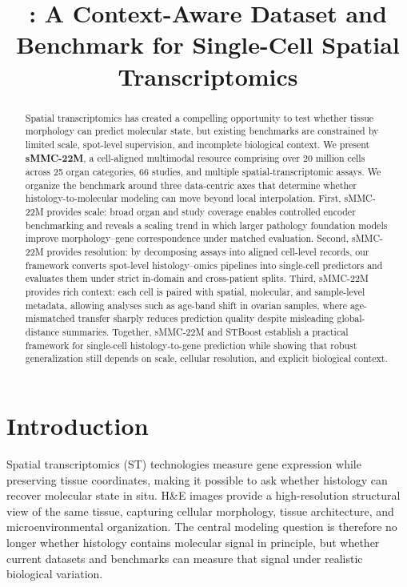 \documentclass{article}
\title{\textbf{\dataset}: A Context-Aware Dataset and Benchmark for Single-Cell Spatial Transcriptomics}
\author{}
\newcommand{\dataset}{sMMC-22M\xspace}
\newcommand{\methodname}{STBoost\xspace}
\begin{document}
\maketitle
\begin{abstract}
Spatial transcriptomics has created a compelling opportunity to test whether tissue morphology can predict molecular state, but existing benchmarks are constrained by limited scale, spot-level supervision, and incomplete biological context. We present \textbf{\dataset}, a cell-aligned multimodal resource comprising over 20 million cells across 25 organ categories, 66 studies, and multiple spatial-transcriptomic assays. We organize the benchmark around three data-centric axes that determine whether histology-to-molecular modeling can move beyond local interpolation. First, \dataset provides scale: broad organ and study coverage enables controlled encoder benchmarking and reveals a scaling trend in which larger pathology foundation models improve morphology--gene correspondence under matched evaluation. Second, \dataset provides resolution: by decomposing assays into aligned cell-level records, our framework converts spot-level histology--omics pipelines into single-cell predictors and evaluates them under strict in-domain and cross-patient splits. Third, \dataset provides rich context: each cell is paired with spatial, molecular, and sample-level metadata, allowing analyses such as age-band shift in ovarian samples, where age-mismatched transfer sharply reduces prediction quality despite misleading global-distance summaries. Together, \dataset and \methodname establish a practical framework for single-cell histology-to-gene prediction while showing that robust generalization still depends on scale, cellular resolution, and explicit biological context.
\end{abstract}
\section{Introduction}
Spatial transcriptomics (ST) technologies measure gene expression while preserving tissue coordinates, making it possible to ask whether histology can recover molecular state in situ. H\&E images provide a high-resolution structural view of the same tissue, capturing cellular morphology, tissue architecture, and microenvironmental organization. The central modeling question is therefore no longer whether histology contains molecular signal in principle, but whether current datasets and benchmarks can measure that signal under realistic biological variation.
\end{document}
